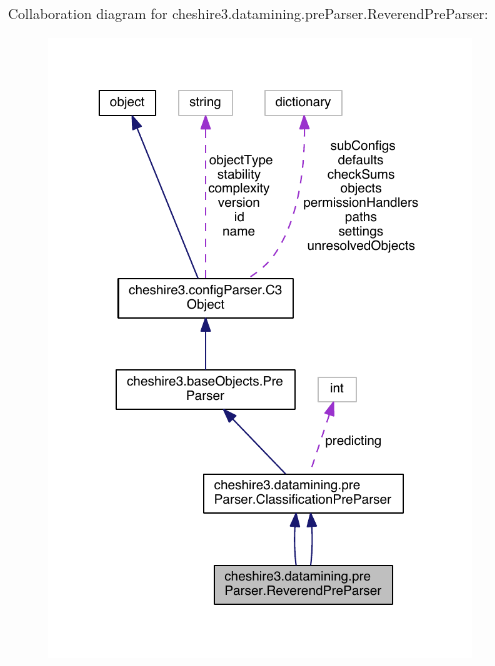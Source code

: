 Collaboration diagram for cheshire3.\-datamining.\-pre\-Parser.\-Reverend\-Pre\-Parser\-:
\nopagebreak
\begin{figure}[H]
\begin{center}
\leavevmode
\includegraphics[width=325pt]{classcheshire3_1_1datamining_1_1pre_parser_1_1_reverend_pre_parser__coll__graph}
\end{center}
\end{figure}
